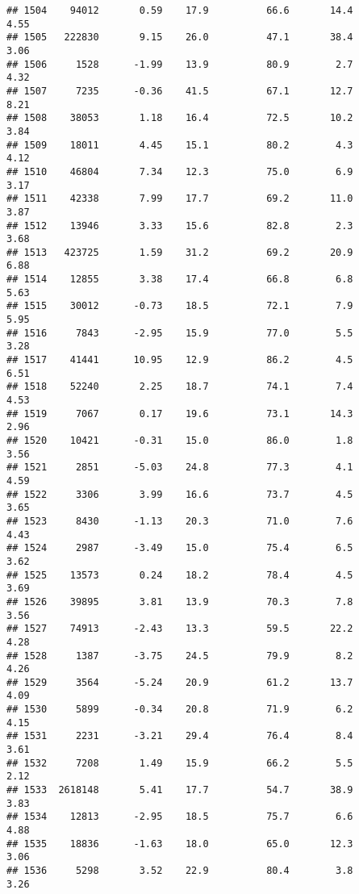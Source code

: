 \documentclass[
]{article}
\begin{document}
\begin{verbatim}
## 1504    94012       0.59    17.9          66.6       14.4              4.55
## 1505   222830       9.15    26.0          47.1       38.4              3.06
## 1506     1528      -1.99    13.9          80.9        2.7              4.32
## 1507     7235      -0.36    41.5          67.1       12.7              8.21
## 1508    38053       1.18    16.4          72.5       10.2              3.84
## 1509    18011       4.45    15.1          80.2        4.3              4.12
## 1510    46804       7.34    12.3          75.0        6.9              3.17
## 1511    42338       7.99    17.7          69.2       11.0              3.87
## 1512    13946       3.33    15.6          82.8        2.3              3.68
## 1513   423725       1.59    31.2          69.2       20.9              6.88
## 1514    12855       3.38    17.4          66.8        6.8              5.63
## 1515    30012      -0.73    18.5          72.1        7.9              5.95
## 1516     7843      -2.95    15.9          77.0        5.5              3.28
## 1517    41441      10.95    12.9          86.2        4.5              6.51
## 1518    52240       2.25    18.7          74.1        7.4              4.53
## 1519     7067       0.17    19.6          73.1       14.3              2.96
## 1520    10421      -0.31    15.0          86.0        1.8              3.56
## 1521     2851      -5.03    24.8          77.3        4.1              4.59
## 1522     3306       3.99    16.6          73.7        4.5              3.65
## 1523     8430      -1.13    20.3          71.0        7.6              4.43
## 1524     2987      -3.49    15.0          75.4        6.5              3.62
## 1525    13573       0.24    18.2          78.4        4.5              3.69
## 1526    39895       3.81    13.9          70.3        7.8              3.56
## 1527    74913      -2.43    13.3          59.5       22.2              4.28
## 1528     1387      -3.75    24.5          79.9        8.2              4.26
## 1529     3564      -5.24    20.9          61.2       13.7              4.09
## 1530     5899      -0.34    20.8          71.9        6.2              4.15
## 1531     2231      -3.21    29.4          76.4        8.4              3.61
## 1532     7208       1.49    15.9          66.2        5.5              2.12
## 1533  2618148       5.41    17.7          54.7       38.9              3.83
## 1534    12813      -2.95    18.5          75.7        6.6              4.88
## 1535    18836      -1.63    18.0          65.0       12.3              3.06
## 1536     5298       3.52    22.9          80.4        3.8              3.26

\end{verbatim}
\end{document}
